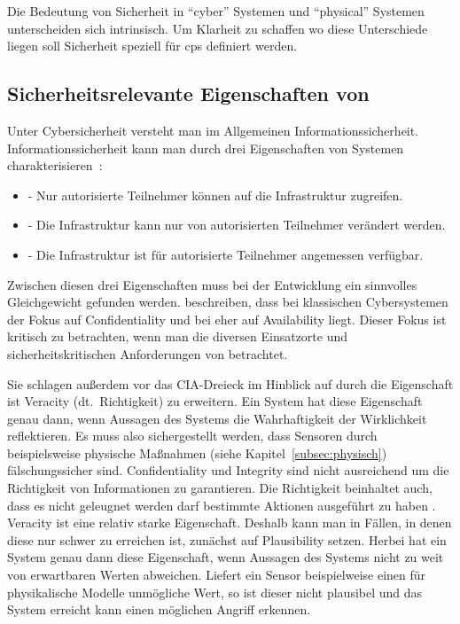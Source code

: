 
Die Bedeutung von Sicherheit in \enquote{cyber} Systemen und \enquote{physical} Systemen unterscheiden sich intrinsisch.
Um Klarheit zu schaffen wo diese Unterschiede liegen soll Sicherheit speziell für \gls{cps} definiert werden.

\subsection{Sicherheitsrelevante Eigenschaften von }\label{subsec:definition}
Unter Cybersicherheit versteht man im Allgemeinen Informationssicherheit.
Informationssicherheit kann man durch drei Eigenschaften von Systemen charakterisieren~\cite[,S.~2]{Cherdantseva2013,SFJ2017}:
\begin{itemize}[noitemsep,wide=0pt]
    \item {} - Nur autorisierte Teilnehmer können auf die Infrastruktur zugreifen.
    \item {} - Die Infrastruktur kann nur von autorisierten Teilnehmer verändert werden.
    \item {} - Die Infrastruktur ist für autorisierte Teilnehmer angemessen verfügbar.
\end{itemize}

Zwischen diesen drei Eigenschaften muss bei der Entwicklung ein sinnvolles Gleichgewicht gefunden werden.
\citeauthor{GK16} beschreiben, dass bei klassischen Cybersystemen der Fokus auf Confidentiality und bei \cps eher auf Availability liegt.
Dieser Fokus ist kritisch zu betrachten, wenn man die diversen Einsatzorte und sicherheitskritischen Anforderungen von \cps betrachtet.

Sie schlagen außerdem vor das CIA-Dreieck im Hinblick auf \cps durch die Eigenschaft ist Veracity (dt.~Richtigkeit) zu erweitern.
Ein System hat diese Eigenschaft genau dann, wenn Aussagen des Systems die Wahrhaftigkeit der  Wirklichkeit reflektieren.
Es muss also sichergestellt werden, dass Sensoren durch beispielsweise physische Maßnahmen (siehe Kapitel~\ref{subsec:physisch}) fälschungssicher sind.
Confidentiality und Integrity sind nicht ausreichend um die Richtigkeit von Informationen zu garantieren.
Die Richtigkeit beinhaltet auch, dass es nicht geleugnet werden darf bestimmte Aktionen ausgeführt zu haben \cite{NIST2013}.
Veracity ist eine relativ starke Eigenschaft.
Deshalb kann man in Fällen, in denen diese nur schwer zu erreichen ist, zunächst auf Plausibility setzen.
Herbei hat ein System genau dann diese Eigenschaft, wenn Aussagen des Systems nicht zu weit von erwartbaren Werten abweichen.
Liefert ein Sensor beispielweise einen für physikalische Modelle unmögliche Wert, so ist dieser nicht plausibel und das System erreicht kann einen möglichen Angriff erkennen. \cite{GK16}

